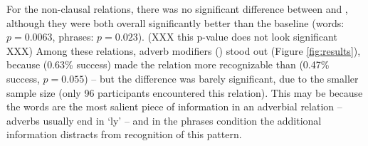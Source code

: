 For the non-clausal relations, there was no significant difference between  and , although they were both overall significantly better than the baseline (words: $p=0.0063$, phrases: $p=0.023$). (XXX this p-value does not look significant XXX) Among these relations, adverb modifiers () stood out (Figure \ref{fig:results}), because  (0.63\% success) made the relation more recognizable than  (0.47\% success, $p = 0.055$) -- but the difference was barely significant, due to the smaller sample size (only 96 participants encountered this relation). This may be because the words are the most salient piece of information in an adverbial relation -- adverbs usually end in `ly' -- and in the phrases condition the additional information distracts from recognition of this pattern.

